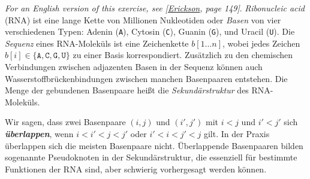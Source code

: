 \documentclass{uebung_cs}
\begin{document}
\begin{aufgabe}[Sekundärstruktur]
    \textit{\footnotesize For an English version of this exercise, see [\href{https://jeffe.cs.illinois.edu/teaching/algorithms/book/Algorithms-JeffE.pdf}{Erickson}, page 149]}.
    \emph{Ribonucleic acid} (RNA) ist eine lange Kette von Millionen Nukleotiden oder \emph{Basen} von vier verschiedenen Typen:
    Adenin (\verb|A|), Cytosin (\verb|C|), Guanin (\verb|G|), und Uracil (\verb|U|). Die \emph{Sequenz} eines RNA-Moleküls ist eine Zeichenkette $b[1\dots n]$, wobei jedes Zeichen $b[i]\in\{\texttt{A}, \texttt{C}, \texttt{G}, \texttt{U}\}$ zu einer Basis korrespondiert.
    Zusätzlich zu den chemischen Verbindungen zwischen adjazenten Basen in der Sequenz können auch Wasserstoffbrückenbindungen zwischen manchen Basenpaaren entstehen.
    Die Menge der gebundenen Basenpaare heißt die \emph{Sekundärstruktur} des RNA-Moleküls.
    
    Wir sagen, dass zwei Basenpaare $(i,j)$ und $(i',j')$ mit $i<j$ und $i'<j'$ sich \textbf{\emph{überlappen}}, wenn $i<i'<j<j'$ oder $i'<i<j'<j$ gilt. In der Praxis überlappen sich die meisten Basenpaare nicht. Überlappende Basenpaaren bilden sogenannte Pseudoknoten in der Sekundärstruktur, die essenziell für bestimmte Funktionen der RNA sind, aber schwierig vorhergesagt werden können.
    

\end{aufgabe}
\end{document}
